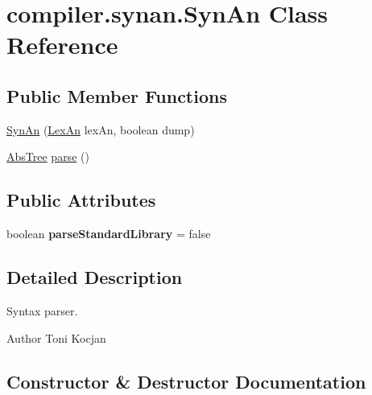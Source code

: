 \hypertarget{classcompiler_1_1synan_1_1_syn_an}{}\section{compiler.\+synan.\+Syn\+An Class Reference}
\label{classcompiler_1_1synan_1_1_syn_an}
\subsection*{Public Member Functions}
\begin{DoxyCompactItemize}
\item 
\hyperlink{classcompiler_1_1synan_1_1_syn_an_a0af29d8d1ea59499f9c5d26327b03468}{Syn\+An} (\hyperlink{classcompiler_1_1lexan_1_1_lex_an}{Lex\+An} lex\+An, boolean dump)
\item 
\hyperlink{classcompiler_1_1abstr_1_1tree_1_1_abs_tree}{Abs\+Tree} \hyperlink{classcompiler_1_1synan_1_1_syn_an_a26b06d720cf4157206e5ee3f91b0238c}{parse} ()
\end{DoxyCompactItemize}
\subsection*{Public Attributes}
\begin{DoxyCompactItemize}
\item 
\mbox{\label{classcompiler_1_1synan_1_1_syn_an_a58bc1af8d2cb00372875b2199e1d92f6}} 
boolean {\bfseries parse\+Standard\+Library} = false
\end{DoxyCompactItemize}


\subsection{Detailed Description}
Syntax parser.

\begin{DoxyAuthor}{Author}
Toni Kocjan 
\end{DoxyAuthor}


\subsection{Constructor \& Destructor Documentation}
\mbox{\label{classcompiler_1_1synan_1_1_syn_an_a0af29d8d1ea59499f9c5d26327b03468}} 
